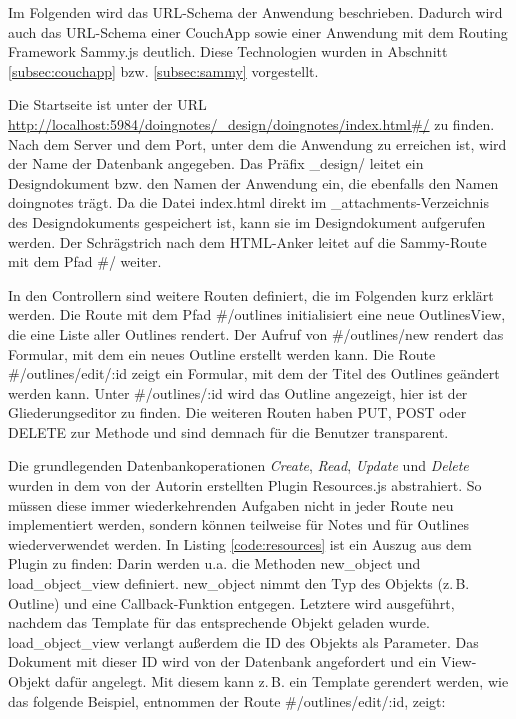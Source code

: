 Im Folgenden wird das URL-Schema der Anwendung beschrieben. Dadurch wird auch das URL-Schema einer CouchApp sowie einer Anwendung mit dem Routing Framework Sammy.js deutlich. Diese Technologien wurden in Abschnitt \ref{subsec:couchapp} bzw. \ref{subsec:sammy} vorgestellt.

Die Startseite ist unter der URL \url{http://localhost:5984/doingnotes/_design/doingnotes/index.html#/} zu finden. Nach dem Server und dem Port, unter dem die Anwendung zu erreichen ist, wird der Name der Datenbank angegeben. Das Präfix {\selectfont \_design/} leitet ein Designdokument bzw. den Namen der Anwendung ein, die ebenfalls den Namen {\selectfont doingnotes} trägt. Da die Datei {\selectfont index.html} direkt im {\selectfont \_attachments}-Verzeichnis des Designdokuments gespeichert ist, kann sie im Designdokument aufgerufen werden. Der Schrägstrich nach dem HTML-Anker leitet auf die Sammy-Route mit dem Pfad {\selectfont\#/} weiter.

In den Controllern sind weitere Routen definiert, die im Folgenden kurz erklärt werden. Die Route mit dem Pfad {\selectfont\#/outlines} initialisiert eine neue {\selectfont OutlinesView}, die eine Liste aller Outlines rendert. Der Aufruf von {\selectfont\#/outlines/new} rendert das Formular, mit dem ein neues {\selectfont Outline} erstellt werden kann. Die Route {\selectfont\#/outlines/edit/:id} zeigt ein Formular, mit dem der Titel des Outlines geändert werden kann. Unter {\selectfont\#/outlines/:id} wird das Outline angezeigt, hier ist der Gliederungseditor zu finden. Die weiteren Routen haben {\selectfont PUT}, {\selectfont POST} oder {\selectfont DELETE} zur Methode und sind demnach für die Benutzer transparent.

Die grundlegenden Datenbankoperationen \textit{Create}, \textit{Read}, \textit{Update} und \textit{Delete} wurden in dem von der Autorin erstellten Plugin {\selectfont Resources.js} abstrahiert. So müssen diese immer wiederkehrenden Aufgaben nicht in jeder Route neu implementiert werden, sondern können teilweise für {\selectfont Notes} und für {\selectfont Outlines} wiederverwendet werden. In Listing \ref{code:resources} ist ein Auszug aus dem Plugin zu finden: Darin werden u.a. die Methoden {\selectfont new\_object} und {\selectfont load\_object\_view} definiert. {\selectfont new\_object} nimmt den Typ des Objekts (z.\,B. {\selectfont Outline}) und eine Callback-Funktion entgegen. Letztere wird ausgeführt, nachdem das Template für das entsprechende Objekt geladen wurde. {\selectfont load\_object\_view} verlangt außerdem die ID des Objekts als Parameter. Das Dokument mit dieser ID wird von der Datenbank angefordert und ein View-Objekt dafür angelegt. Mit diesem kann z.\,B. ein Template gerendert werden, wie das folgende Beispiel, entnommen der Route {\selectfont\#/outlines/edit/:id}, zeigt:

